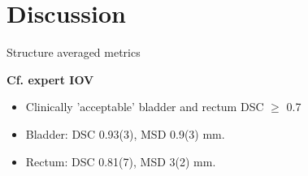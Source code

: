 \documentclass[9pt]{beamer}
\begin{document}
\section{Discussion}
\begin{frame}{Structure averaged metrics}



\vspace{4mm}
\textbf{Cf. expert IOV}\footnotemark[2]
\begin{itemize}
\item Clinically 'acceptable' bladder and rectum DSC $\geq$ 0.7
\item Bladder:  DSC 0.93(3), MSD 0.9(3) mm.
\item Rectum:  DSC 0.81(7), MSD 3(2) mm.
\end{itemize}
\vspace{2mm}
\end{frame}
%
%
%

\end{document}

